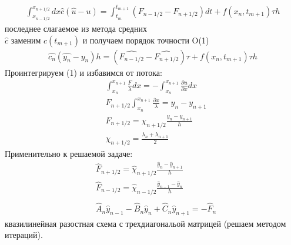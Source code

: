 \documentclass[12pt,a4paper]{article}
\begin{document}
	\begin{align*}
	\int_{x_{n-1/2}}^{x_{n+1/2}} dx \hat{c}(\hat{u} - u) = \int_{t_m}^{t_{m+1}} (F_{n-1/2} - F_{n+1/2})dt + f(x_n, t_{m+1})\tau h 
	\end{align*}
	последнее слагаемое из метода средних\\
	$\hat{c}$ заменим $c(t_{m+1})$ и  получаем порядок точности O(1)\\
	\begin{align*}
	\hat{c_n}(\hat{y_n} - y_n) h = (\hat{F_{n-1/2}} - \hat{F_{n+1/2}}) \tau + f(x_n, t_{m+1}) \tau h
	\end{align*}
	Проинтегрируем (1) и избавимся  от потока:\\
	\begin{align*}
	&\int_{x_n}^{x_{n+1}}\frac{F}{\lambda}dx = -\int_{x_n}^{x_{n+1}}\frac{\partial u}{\partial x} dx\\
	&F_{n+1/2}\int_{x_n}^{x_{n+1}}\frac{\partial x}{\lambda} = y_n - y_{n+1}\\
	&F_{n+1/2} = \chi_{n+1/2}\frac{y_n - y_{n+1}}{h}\\
	&\chi_{n+1/2} = \frac{\lambda_n + \lambda_{n+1}}{2}	
	\end{align*}
	Применительно к решаемой задаче:\\
	\begin{align*}
	&\hat{F}_{n+1/2} = \hat{\chi}_{n+1/2}\frac{\hat{y}_n - \hat{y}_{n+1}}{h}\\
	&\hat{F}_{n-1/2} = \hat{\chi}_{n-1/2}\frac{\hat{y}_{n-1} - \hat{y}_{n}}{h}\\\\
	&\hat{A}_n\hat{y}_{n-1} - \hat{B}_n \hat{y}_n + \hat{C}_n \hat{y}_{n+1} = -\hat{F}_n
	\end{align*}	
	квазилинейная разостная схема с трехдиагональой матрицей (решаем методом итераций).
\end{document}
